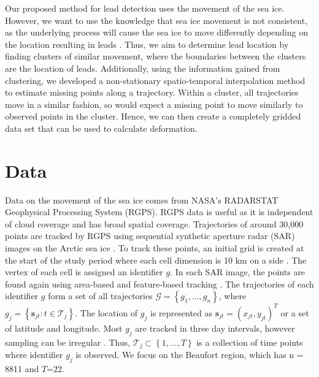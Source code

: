 \documentclass[12pt]{article}
\begin{document}
Our proposed method for lead detection uses the movement of the sea ice.
However, we want to use the knowledge that sea ice movement is not
consistent, as the underlying process will cause the sea ice to move
differently depending on the location resulting in leads
\citep{peterson_evaluating_2011}. Thus, we aim to determine lead
location by finding clusters of similar movement, where the boundaries
between the clusters are the location of leads. Additionally, using the
information gained from clustering, we developed a non-stationary
spatio-temporal interpolation method to estimate missing points along a
trajectory. Within a cluster, all trajectories move in a similar
fashion, so would expect a missing point to move similarly to observed
points in the cluster. Hence, we can then create a completely gridded
data set that can be used to calculate deformation.

\hypertarget{data}{%
\section{Data}\label{data}}

Data on the movement of the sea ice comes from NASA's RADARSTAT
Geophysical Processing System (RGPS). RGPS data is useful as it is
independent of cloud coverage and has broad spatial coverage.
Trajectories of around 30,000 points are tracked by RGPS using
sequential synthetic aperture radar (SAR) images on the Arctic sea ice
\citep{lindsay_radarsat_2003}. To track these points, an initial grid is
created at the start of the study period where each cell dimension is 10
km on a side \citep{kwok_seasonal_2002}. The vertex of each cell is
assigned an identifier \(g\). In each SAR image, the points are found
again using area-based and feature-based tracking
\citep{peterson_evaluating_2011}. The trajectories of each identifier
\(g\) form a set of all trajectories
\(\mathcal{G} =\left\{g_1,...,g_n\right\}\), where
\(g_j = \left\{\textbf{s}_{jt}: t \in \mathcal{T}_j\right\}\). The
location of \(g_j\) is represented as
\(\textbf{s}_{jt} = (x_{jt}, y_{jt})^T\) or a set of latitude and
longitude. Most \(g_j\) are tracked in three day intervals, however
sampling can be irregular \citep{peterson_evaluating_2011}. Thus,
\(\mathcal{T}_j \subset \left\{1,...,T\right\}\) is a collection of time
points where identifier \(g_j\) is observed. We focus on the Beaufort
region, which has n = 8811 and \(T\)=22.
\end{document}
